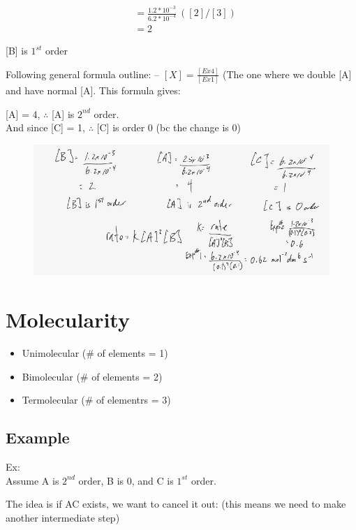 \documentclass{article}
\begin{document}
\begin{align*}
[B] & = \frac{1.2*10^{-3}}{6.2*10^{-4}}\ ([2]/[3])\\
&= 2
\end{align*}

[B] is $1^{st}$ order

Following general formula outline: -- $[X] = \frac{[Ex4]}{[Ex1]}$ (The one where we double [A] and have normal [A]. This formula gives:

[A] = 4, $\therefore$ [A] is $2^{nd}$ order.\\
And since [C] = 1, $\therefore$ [C] is order 0 (bc the change is 0)

\begin{figure}[H]
\centering
\includegraphics[width=\textwidth]{2.3eq.jpg}
\end{figure}


\pagebreak
\section{Molecularity}
\begin{itemize}
\item Unimolecular (\# of elements = 1)
\item Bimolecular (\# of elements = 2)
\item Termolecular (\# of elementrs = 3)
\end{itemize}

\subsection{Example}
Ex: \\Assume A is $2^{nd}$ order, B is 0, and C is $1^{st}$ order.

The idea is if AC exists, we want to cancel it out: (this means we need to make another intermediate step)
\end{document}
